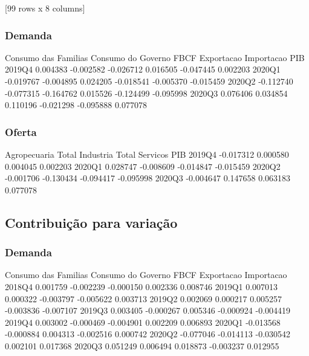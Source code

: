 \documentclass{SelfArx}
\begin{document}
[99 rows x 8 columns]

\subsubsection*{Demanda}
\label{sec:org02c779a}

        Consumo das Familias  Consumo do Governo      FBCF  Exportacao  Importacao       PIB
2019Q4              0.004383           -0.002582 -0.026712    0.016505   -0.047445  0.002203
2020Q1             -0.019767           -0.004895  0.024205   -0.018541   -0.005370 -0.015459
2020Q2             -0.112740           -0.077315 -0.164762    0.015526   -0.124499 -0.095998
2020Q3              0.076406            0.034854  0.110196   -0.021298   -0.095888  0.077078

\subsubsection*{Oferta}
\label{sec:org643b55b}


        Agropecuaria  Total Industria  Total Servicos       PIB
2019Q4     -0.017312         0.000580        0.004045  0.002203
2020Q1      0.028747        -0.008609       -0.014847 -0.015459
2020Q2     -0.001706        -0.130434       -0.094417 -0.095998
2020Q3     -0.004647         0.147658        0.063183  0.077078


\subsection*{Contribuição para variação}
\label{sec:org89312ec}

\subsubsection*{Demanda}
\label{sec:org60d4ebd}

        Consumo das Familias  Consumo do Governo      FBCF  Exportacao  Importacao
2018Q4              0.001759           -0.002239 -0.000150    0.002336    0.008746
2019Q1              0.007013            0.000322 -0.003797   -0.005622    0.003713
2019Q2              0.002069            0.000217  0.005257   -0.003836   -0.007107
2019Q3              0.003405           -0.000267  0.005346   -0.000924   -0.004419
2019Q4              0.003002           -0.000469 -0.004901    0.002209    0.006893
2020Q1             -0.013568           -0.000884  0.004313   -0.002516    0.000742
2020Q2             -0.077046           -0.014113 -0.030542    0.002101    0.017368
2020Q3              0.051249            0.006494  0.018873   -0.003237    0.012955
\end{document}

